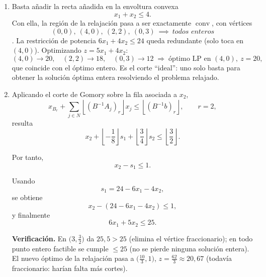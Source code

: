 \begin{enumerate}
  \item[(b)]
 
Basta a\~nadir la recta añadida en la envoltura convexa
\[
\boxed{x_1+x_2 \le 4.}
\]
Con ella, la regi\'on de la relajaci\'on pasa a ser exactamente $\operatorname{conv}$, con v\'ertices
\begin{equation*}
    (0,0),\:(4,0),\:(2,2),\:(0,3) \: \implies \:\textit{todos enteros}
\end{equation*}
. La restricci\'on de potencia
$6x_1+4x_2\le24$ queda redundante (solo toca en $(4,0)$). Optimizando $z=5x_1+4x_2$:
\[
(4,0)\to 20,\quad (2,2)\to 18,\quad (0,3)\to 12 \;\Rightarrow\; \text{\'optimo LP en }(4,0),\ z=20,
\]
que coincide con el \'optimo entero. Es el corte ``ideal'': uno solo basta para obtener la solución óptima entera resolviendo el problema relajado.
 
  \item[(c)]

Aplicando el corte de Gomory sobre la fila asociada a \(x_2\),
\[
x_{B_r}+
\sum_{j\in N}
\left\lfloor (B^{-1}A_j)_r\right\rfloor x_j
\leq
\left\lfloor (B^{-1}b)_r\right\rfloor,
\qquad r=2,
\]
resulta
\[
x_2+
\left\lfloor-\frac18\right\rfloor s_1+
\left\lfloor\frac34\right\rfloor s_2
\leq
\left\lfloor\frac32\right\rfloor.
\]

Por tanto,
\[
x_2-s_1\leq 1.
\]

Usando
\[
s_1=24-6x_1-4x_2,
\]
se obtiene
\[
x_2-\left(24-6x_1-4x_2\right)\leq 1,
\]
y finalmente
\[
\boxed{6x_1+5x_2\leq 25.}
\]
 
\textbf{Verificaci\'on.} En $\big(3,\tfrac32\big)$ da $25{,}5>25$ (elimina el v\'ertice fraccionario);
en todo punto entero factible se cumple $\le 25$ (no se pierde ninguna soluci\'on entera). El nuevo
\'optimo de la relajaci\'on pasa a $\big(\tfrac{10}{3},1\big)$, $z=\tfrac{62}{3}\approx 20{,}67$
(todav\'ia fraccionario: har\'ian falta m\'as cortes).

\begin{center}
\end{center}
\end{enumerate}

